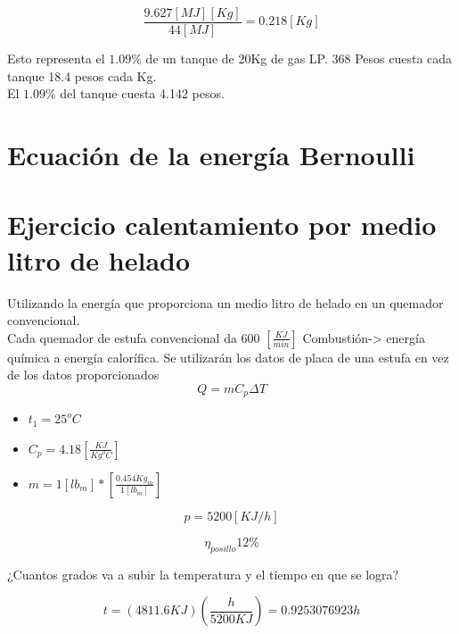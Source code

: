 \documentclass[]{article}
\begin{document}
\begin{equation}
  \frac{9.627 [MJ] [Kg]}{44[MJ]}=0.218[Kg]
\end{equation}

Esto representa el $1.09\%$ de un tanque de 20Kg de gas LP. 368 Pesos cuesta cada tanque 18.4 pesos cada Kg.\\

El $1.09\%$ del tanque cuesta 4.142 pesos.\\

\section{Ecuación de la energía Bernoulli}


\section{Ejercicio calentamiento por medio litro de helado}

Utilizando la energía que proporciona un medio litro de helado en un quemador convencional.\\

Cada quemador de estufa convencional da 600 $[\frac{KJ}{min}]$
Combustión-> energía química a energía calorífica. Se utilizarán los datos de placa de una estufa en vez de los datos proporcionados\\



\begin{equation}
   Q=mC_p\Delta T
\end{equation}

\begin{itemize}
	\item $t_1=25^oC$
	\item $C_p=4.18[\frac{KJ}{Kg^oC}]$
	\item $m=1[lb_m]*[\frac{0.454Kg_m}{1[lb_m]}]$
\end{itemize}


\begin{equation}
    p=5200[KJ/h]
\end{equation}


\begin{equation}
    \eta_{posillo} 12 \%
\end{equation}




¿Cuantos grados va a subir la temperatura y el tiempo en que se logra?


\begin{equation}
 t=(4811.6KJ)(\frac{h}{5200KJ})=0.9253076923h
\end{equation}
\end{document}
